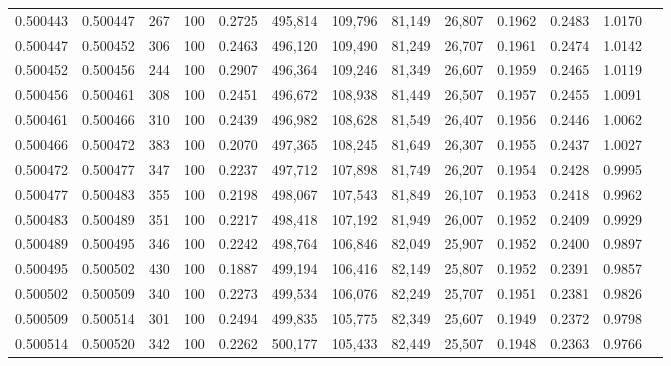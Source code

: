 \begin{tabular}{rrrrrrrrrrrrr}
0.500443 & 0.500447 &   267 & 100 &                                     0.2725 & 495,814 & 109,796 &  81,149 &  26,807 & 0.1962 & 0.2483 & 1.0170 \\
0.500447 & 0.500452 &   306 & 100 &                                     0.2463 & 496,120 & 109,490 &  81,249 &  26,707 & 0.1961 & 0.2474 & 1.0142 \\
0.500452 & 0.500456 &   244 & 100 &                                     0.2907 & 496,364 & 109,246 &  81,349 &  26,607 & 0.1959 & 0.2465 & 1.0119 \\
0.500456 & 0.500461 &   308 & 100 &                                     0.2451 & 496,672 & 108,938 &  81,449 &  26,507 & 0.1957 & 0.2455 & 1.0091 \\
0.500461 & 0.500466 &   310 & 100 &                                     0.2439 & 496,982 & 108,628 &  81,549 &  26,407 & 0.1956 & 0.2446 & 1.0062 \\
0.500466 & 0.500472 &   383 & 100 &                                     0.2070 & 497,365 & 108,245 &  81,649 &  26,307 & 0.1955 & 0.2437 & 1.0027 \\
0.500472 & 0.500477 &   347 & 100 &                                     0.2237 & 497,712 & 107,898 &  81,749 &  26,207 & 0.1954 & 0.2428 & 0.9995 \\
0.500477 & 0.500483 &   355 & 100 &                                     0.2198 & 498,067 & 107,543 &  81,849 &  26,107 & 0.1953 & 0.2418 & 0.9962 \\
0.500483 & 0.500489 &   351 & 100 &                                     0.2217 & 498,418 & 107,192 &  81,949 &  26,007 & 0.1952 & 0.2409 & 0.9929 \\
0.500489 & 0.500495 &   346 & 100 &                                     0.2242 & 498,764 & 106,846 &  82,049 &  25,907 & 0.1952 & 0.2400 & 0.9897 \\
0.500495 & 0.500502 &   430 & 100 &                                     0.1887 & 499,194 & 106,416 &  82,149 &  25,807 & 0.1952 & 0.2391 & 0.9857 \\
0.500502 & 0.500509 &   340 & 100 &                                     0.2273 & 499,534 & 106,076 &  82,249 &  25,707 & 0.1951 & 0.2381 & 0.9826 \\
0.500509 & 0.500514 &   301 & 100 &                                     0.2494 & 499,835 & 105,775 &  82,349 &  25,607 & 0.1949 & 0.2372 & 0.9798 \\
0.500514 & 0.500520 &   342 & 100 &                                     0.2262 & 500,177 & 105,433 &  82,449 &  25,507 & 0.1948 & 0.2363 & 0.9766 \\

\end{tabular}
